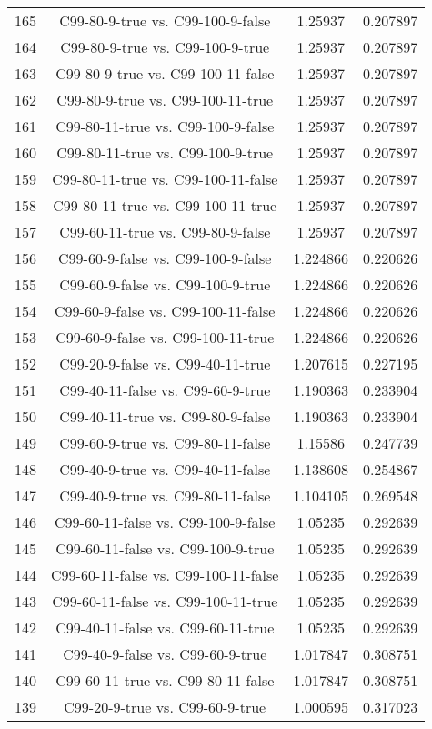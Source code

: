 \documentclass[a4paper,10pt]{article}
\begin{document}
\begin{landscape}
\begin{table}[!htp]
\begin{tabular}{cccc}
165&C99-80-9-true vs. C99-100-9-false&1.25937&0.207897\\
164&C99-80-9-true vs. C99-100-9-true&1.25937&0.207897\\
163&C99-80-9-true vs. C99-100-11-false&1.25937&0.207897\\
162&C99-80-9-true vs. C99-100-11-true&1.25937&0.207897\\
161&C99-80-11-true vs. C99-100-9-false&1.25937&0.207897\\
160&C99-80-11-true vs. C99-100-9-true&1.25937&0.207897\\
159&C99-80-11-true vs. C99-100-11-false&1.25937&0.207897\\
158&C99-80-11-true vs. C99-100-11-true&1.25937&0.207897\\
157&C99-60-11-true vs. C99-80-9-false&1.25937&0.207897\\
156&C99-60-9-false vs. C99-100-9-false&1.224866&0.220626\\
155&C99-60-9-false vs. C99-100-9-true&1.224866&0.220626\\
154&C99-60-9-false vs. C99-100-11-false&1.224866&0.220626\\
153&C99-60-9-false vs. C99-100-11-true&1.224866&0.220626\\
152&C99-20-9-false vs. C99-40-11-true&1.207615&0.227195\\
151&C99-40-11-false vs. C99-60-9-true&1.190363&0.233904\\
150&C99-40-11-true vs. C99-80-9-false&1.190363&0.233904\\
149&C99-60-9-true vs. C99-80-11-false&1.15586&0.247739\\
148&C99-40-9-true vs. C99-40-11-false&1.138608&0.254867\\
147&C99-40-9-true vs. C99-80-11-false&1.104105&0.269548\\
146&C99-60-11-false vs. C99-100-9-false&1.05235&0.292639\\
145&C99-60-11-false vs. C99-100-9-true&1.05235&0.292639\\
144&C99-60-11-false vs. C99-100-11-false&1.05235&0.292639\\
143&C99-60-11-false vs. C99-100-11-true&1.05235&0.292639\\
142&C99-40-11-false vs. C99-60-11-true&1.05235&0.292639\\
141&C99-40-9-false vs. C99-60-9-true&1.017847&0.308751\\
140&C99-60-11-true vs. C99-80-11-false&1.017847&0.308751\\
139&C99-20-9-true vs. C99-60-9-true&1.000595&0.317023\\

\end{tabular}
\end{table}
\end{landscape}
\end{document}
